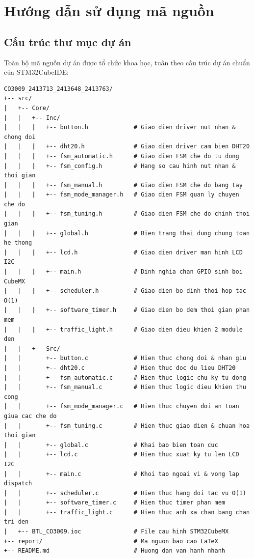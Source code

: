 \section{Hướng dẫn sử dụng mã nguồn}

\subsection{Cấu trúc thư mục dự án}
Toàn bộ mã nguồn dự án được tổ chức khoa học, tuân theo cấu trúc dự án chuẩn của STM32CubeIDE:

\begin{lstlisting}[style=mystyle, caption={Cấu trúc cây thư mục mã nguồn dự án}]
CO3009_2413713_2413648_2413763/
+-- src/
|   +-- Core/
|   |   +-- Inc/
|   |   |   +-- button.h             # Giao dien driver nut nhan & chong doi
|   |   |   +-- dht20.h              # Giao dien driver cam bien DHT20
|   |   |   +-- fsm_automatic.h      # Giao dien FSM che do tu dong
|   |   |   +-- fsm_config.h         # Hang so cau hinh nut nhan & thoi gian
|   |   |   +-- fsm_manual.h         # Giao dien FSM che do bang tay
|   |   |   +-- fsm_mode_manager.h   # Giao dien FSM quan ly chuyen che do
|   |   |   +-- fsm_tuning.h         # Giao dien FSM che do chinh thoi gian
|   |   |   +-- global.h             # Bien trang thai dung chung toan he thong
|   |   |   +-- lcd.h                # Giao dien driver man hinh LCD I2C
|   |   |   +-- main.h               # Dinh nghia chan GPIO sinh boi CubeMX
|   |   |   +-- scheduler.h          # Giao dien bo dinh thoi hop tac O(1)
|   |   |   +-- software_timer.h     # Giao dien bo dem thoi gian phan mem
|   |   |   +-- traffic_light.h      # Giao dien dieu khien 2 module den
|   |   +-- Src/
|   |       +-- button.c             # Hien thuc chong doi & nhan giu
|   |       +-- dht20.c              # Hien thuc doc du lieu DHT20
|   |       +-- fsm_automatic.c      # Hien thuc logic chu ky tu dong
|   |       +-- fsm_manual.c         # Hien thuc logic dieu khien thu cong
|   |       +-- fsm_mode_manager.c   # Hien thuc chuyen doi an toan giua cac che do
|   |       +-- fsm_tuning.c         # Hien thuc giao dien & chuan hoa thoi gian
|   |       +-- global.c             # Khai bao bien toan cuc
|   |       +-- lcd.c                # Hien thuc xuat ky tu len LCD I2C
|   |       +-- main.c               # Khoi tao ngoai vi & vong lap dispatch
|   |       +-- scheduler.c          # Hien thuc hang doi tac vu O(1)
|   |       +-- software_timer.c     # Hien thuc timer phan mem
|   |       +-- traffic_light.c      # Hien thuc anh xa chan bang chan tri den
|   +-- BTL_CO3009.ioc               # File cau hinh STM32CubeMX
+-- report/                          # Ma nguon bao cao LaTeX
+-- README.md                        # Huong dan van hanh nhanh
\end{lstlisting}

